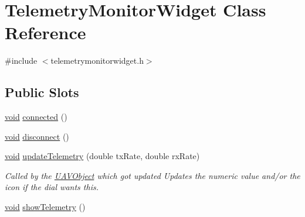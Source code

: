 \hypertarget{class_telemetry_monitor_widget}{\section{\-Telemetry\-Monitor\-Widget \-Class \-Reference}
\label{class_telemetry_monitor_widget}
}


{\ttfamily \#include $<$telemetrymonitorwidget.\-h$>$}

\subsection*{\-Public \-Slots}
\begin{DoxyCompactItemize}
\item 
\hyperlink{group___u_a_v_objects_plugin_ga444cf2ff3f0ecbe028adce838d373f5c}{void} \hyperlink{group___core_plugin_gaa179b8e4f3d5521f7015fe7a0c2a72cd}{connected} ()
\item 
\hyperlink{group___u_a_v_objects_plugin_ga444cf2ff3f0ecbe028adce838d373f5c}{void} \hyperlink{group___core_plugin_ga94648c5dfd178bef04f3050534c2ab8d}{disconnect} ()
\item 
\hyperlink{group___u_a_v_objects_plugin_ga444cf2ff3f0ecbe028adce838d373f5c}{void} \hyperlink{group___core_plugin_ga1a8b99a026baf3050eacb392090bbc56}{update\-Telemetry} (double tx\-Rate, double rx\-Rate)
\begin{DoxyCompactList}\small\item\em \-Called by the \hyperlink{class_u_a_v_object}{\-U\-A\-V\-Object} which got updated \-Updates the numeric value and/or the icon if the dial wants this. \end{DoxyCompactList}\item 
\hyperlink{group___u_a_v_objects_plugin_ga444cf2ff3f0ecbe028adce838d373f5c}{void} \hyperlink{group___core_plugin_ga48e3859826fc4309c7d5939ef80d1ca8}{show\-Telemetry} ()
\end{DoxyCompactItemize}
